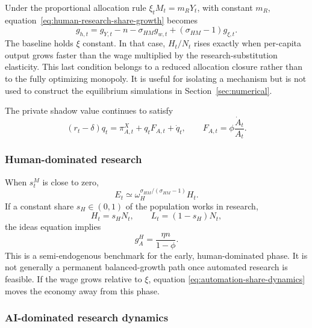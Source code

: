 Under the proportional allocation rule $\xi_tM_t=m_RY_t$, with constant $m_R$,
equation~\eqref{eq:human-research-share-growth} becomes
\begin{equation}
    g_{h,t}
    =
    g_{Y,t}-n-\sigma_{HM} g_{w,t}+(\sigma_{HM}-1)g_{\xi,t}.
    \label{eq:numerical-human-research-share-growth}
\end{equation}
The baseline holds $\xi$ constant. In that case, $H_t/N_t$ rises exactly when
per-capita output grows faster than the wage multiplied by the research-substitution
elasticity. This last condition belongs to a reduced allocation closure rather than
to the fully optimizing monopoly. It is useful for isolating a mechanism but is not
used to construct the equilibrium simulations in Section~\ref{sec:numerical}.

The private shadow value continues to satisfy
\begin{equation}
    (r_t-\delta)q_t
    =
    \pi^X_{A,t}+q_tF_{A,t}+\dot q_t,
    \qquad
    F_{A,t}=\phi\frac{\dot A_t}{A_t}.
    \label{eq:private-costate}
\end{equation}

\subsubsection{Human-dominated research}

When $s^M_t$ is close to zero,
\begin{equation}
    E_t
    \simeq
    \omega_H^{\sigma_{HM}/(\sigma_{HM}-1)}H_t.
    \label{eq:human-dominated-research}
\end{equation}
If a constant share $s_H\in(0,1)$ of the population works in research,
\begin{equation}
    H_t=s_HN_t,
    \qquad
    L_t=(1-s_H)N_t,
    \label{eq:research-share}
\end{equation}
the ideas equation implies
\begin{equation}
    g_A^H
    =
    \frac{\eta n}{1-\phi}.
    \label{eq:human-dominated-ga}
\end{equation}
This is a semi-endogenous benchmark for the early, human-dominated phase. It is not
generally a permanent balanced-growth path once automated research is feasible. If
the wage grows relative to $\xi$, equation \eqref{eq:automation-share-dynamics}
moves the economy away from this phase.

\subsubsection{AI-dominated research dynamics}

